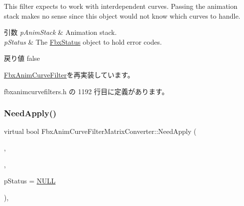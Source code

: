 This filter expects to work with interdependent curves. Passing the animation stack makes no sense since this object would not know which curves to handle. 
\begin{DoxyParams}{引数}
{\em p\+Anim\+Stack} & Animation stack. \\
\hline
{\em p\+Status} & The \hyperlink{class_fbx_status}{Fbx\+Status} object to hold error codes. \\
\hline
\end{DoxyParams}
\begin{DoxyReturn}{戻り値}
{\ttfamily false} 
\end{DoxyReturn}


\hyperlink{class_fbx_anim_curve_filter_af95af2469851b88b4f6d38401ace5791}{Fbx\+Anim\+Curve\+Filter}を再実装しています。



 fbxanimcurvefilters.\+h の 1192 行目に定義があります。

\mbox{\label{class_fbx_anim_curve_filter_matrix_converter_a8f4e811fedfacc4bc5a90942d2a2bfd5}} 
\subsubsection{\texorpdfstring{Need\+Apply()}{NeedApply()}\hspace{0.1cm}{\footnotesize\ttfamily [4/6]}}
{\footnotesize\ttfamily virtual bool Fbx\+Anim\+Curve\+Filter\+Matrix\+Converter\+::\+Need\+Apply (\begin{DoxyParamCaption}\item[{\hyperlink{class_fbx_object}{Fbx\+Object} $\ast$}]{,  }\item[{\hyperlink{class_fbx_anim_stack}{Fbx\+Anim\+Stack} $\ast$}]{,  }\item[{\hyperlink{class_fbx_status}{Fbx\+Status} $\ast$}]{p\+Status = {\ttfamily \hyperlink{fbxarch_8h_a070d2ce7b6bb7e5c05602aa8c308d0c4}{N\+U\+LL}} }\end{DoxyParamCaption})\hspace{0.3cm}{\ttfamily [inline]}, {\ttfamily [virtual]}}

